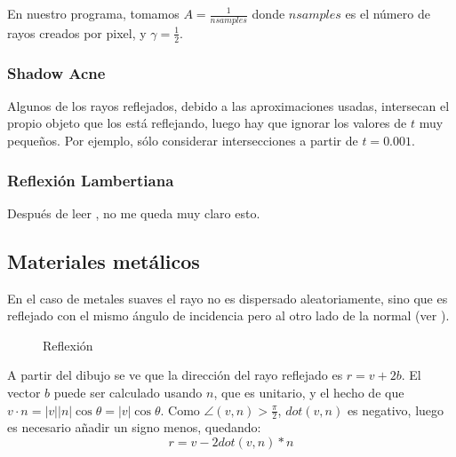 \documentclass[12pt]{article}
\theoremstyle{definition}
\theoremstyle{remark}
\begin{document}
En nuestro programa, tomamos $A=\frac{1}{nsamples}$ donde $nsamples$ es el número de rayos creados por pixel, y $\gamma=\frac{1}{2}$.

\subsubsection{Shadow Acne}

Algunos de los rayos reflejados, debido a las aproximaciones usadas, intersecan el propio objeto que los está reflejando, luego hay que ignorar los valores de $t$ muy pequeños. Por ejemplo, sólo considerar intersecciones a partir de $t=0.001$.

\subsubsection{Reflexión Lambertiana}

Después de leer \cite{lambertian}, no me queda muy claro esto.

\subsection{Materiales metálicos}

En el caso de metales suaves el rayo no es dispersado aleatoriamente, sino que es reflejado con el mismo ángulo de incidencia pero al otro lado de la normal (ver \cite{beam}).

\begin{figure}[H]
\centering
{}
\caption{Reflexión}
\end{figure}

A partir del dibujo se ve que la dirección del rayo reflejado es $r=v+2b$. El vector $b$ puede ser calculado usando $n$, que es unitario, y el hecho de que $v\cdot n=|v||n|\cos\theta=|v|\cos\theta$. Como $\angle (v,n)> \frac{\pi}{2}$, $dot(v,n)$ es negativo, luego es necesario añadir un signo menos, quedando:
\[
r=v-2dot(v,n)*n
\]
\end{document}

